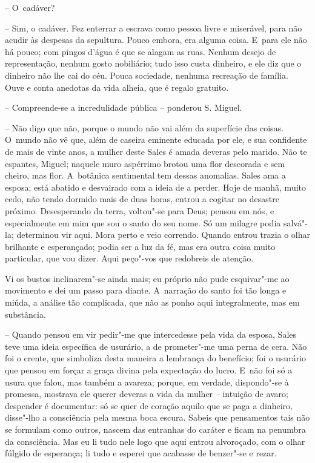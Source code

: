 -- O~cadáver?

-- Sim, o cadáver. Fez enterrar a escrava como pessoa livre e miserável,
para não acudir às despesas da sepultura. Pouco embora, era alguma
coisa. E~para ele não há pouco; com pingos d'água é que se alagam as
ruas. Nenhum desejo de representação, nenhum gosto nobiliário; tudo isso
custa dinheiro, e ele diz que o dinheiro não lhe cai do céu. Pouca
sociedade, nenhuma recreação de família. Ouve e conta anedotas da vida
alheia, que é regalo gratuito.

-- Compreende-se a incredulidade pública -- ponderou S. Miguel.

-- Não digo que não, porque o mundo não vai além da superfície das
coisas. O~mundo não vê que, além de caseira eminente educada por ele, e
sua confidente de mais de vinte anos, a mulher deste Sales é amada
deveras pelo marido. Não te espantes, Miguel; naquele muro aspérrimo
brotou uma flor descorada e sem cheiro, mas flor. A~botânica sentimental
tem dessas anomalias. Sales ama a esposa; está abatido e desvairado com
a ideia de a perder. Hoje de manhã, muito cedo, não tendo dormido mais
de duas horas, entrou a cogitar no desastre próximo. Desesperando da
terra, voltou"-se para Deus; pensou em nós, e especialmente em mim que
sou o santo do seu nome. Só um milagre podia salvá"-la; determinou vir
aqui. Mora perto e veio correndo. Quando entrou trazia o olhar brilhante
e esperançado; podia ser a luz da fé, mas era outra coisa muito
particular, que vou dizer. Aqui peço"-vos que redobreis de atenção.

Vi os bustos inclinarem"-se ainda mais; eu próprio não pude esquivar"-me
ao movimento e dei um passo para diante. A~narração do santo foi tão
longa e miúda, a análise tão complicada, que não as ponho aqui
integralmente, mas em substância.

-- Quando pensou em vir pedir"-me que intercedesse pela vida da esposa,
Sales teve uma ideia específica de usurário, a de prometer"-me uma perna
de cera. Não foi o crente, que simboliza desta maneira a lembrança do
benefício; foi o usurário que pensou em forçar a graça divina pela
expectação do lucro. E~não foi só a usura que falou, mas também a
avareza; porque, em verdade, dispondo"-se à promessa, mostrava ele querer
deveras a vida da mulher -- intuição de avaro; despender é documentar:
só se quer de coração aquilo que se paga a dinheiro, disse"-lho a
consciência pela mesma boca escura. Sabeis que pensamentos tais não se
formulam como outros, nascem das entranhas do caráter e ficam na
penumbra da consciência. Mas eu li tudo nele logo que aqui entrou
alvoroçado, com o olhar fúlgido de esperança; li tudo e esperei que
acabasse de benzer"-se e rezar.

